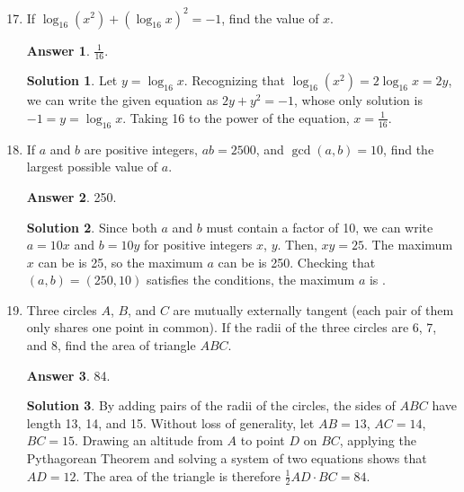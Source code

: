 \documentclass[11pt]{article}
\theoremstyle{definition}
\newtheorem*{solution}{Solution}
\newtheorem*{answer}{Answer}
\begin{document}
\begin{enumerate}
\setcounter{enumi}{16}

\item If $\log_{16}(x^2) + (\log_{16}{x})^2 = -1$, find the value of $x$.

\begin{answer}
$\frac{1}{16}$.
\end{answer}
\begin{solution} Let $y = \log_{16}{x}$. Recognizing that $\log_{16}{(x^2)} = 2 \log_{16}{x} = 2y$, we can write the given equation as $2y + y^2 = -1$, whose only solution is $-1 = y = \log_{16}{x}$. Taking 16 to the power of the equation, $x = \boxed{\frac{1}{16}}$.

\end{solution}

\item If $a$ and $b$ are positive integers, $ab = 2500$, and $\gcd(a,b) = 10$, find the largest possible value of $a$.

\begin{answer}
250.
\end{answer}
\begin{solution} Since both $a$ and $b$ must contain a factor of 10, we can write $a = 10x$ and $b = 10y$ for positive integers $x$, $y$. Then, $xy = 25$. The maximum $x$ can be is 25, so the maximum $a$ can be is 250. Checking that $(a, b) = (250, 10)$ satisfies the conditions, the maximum $a$ is .

\end{solution}

\item Three circles $A$, $B$, and $C$ are mutually externally tangent (each pair of them only shares one point in common). If the radii of the three circles are 6, 7, and 8, find the area of triangle $ABC$.

\begin{answer}
84.
\end{answer}
\begin{solution} By adding pairs of the radii of the circles, the sides of $ABC$ have length 13, 14, and 15. Without loss of generality, let $AB = 13$, $AC = 14$, $BC = 15$. Drawing an altitude from $A$ to point $D$ on $BC$, applying the Pythagorean Theorem and solving a system of two equations shows that $AD = 12$. The area of the triangle is therefore $\frac{1}{2} AD \cdot BC = \boxed{84}$.

\end{solution}


\end{enumerate}
\end{document}
